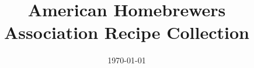 \documentclass[10pt,oneside]{scrbook}
\begin{document}
\title{American Homebrewers Association Recipe Collection}
\date{\today}
\maketitle

\frontmatter

\tableofcontents

\mainmatter
\twocolumn












\backmatter


\end{document}

